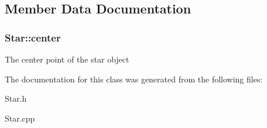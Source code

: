 \subsection{Member Data Documentation}
\hypertarget{classStar_a56595bbf2da9c7b2de04be76f61d2e93}{
\subsubsection[{center}]{ Star\-::center}}\label{classStar_a56595bbf2da9c7b2de04be76f61d2e93}
The center point of the star object 

The documentation for this class was generated from the following files\-:\begin{DoxyCompactItemize}
\item 
Star.\-h\item 
Star.\-cpp\end{DoxyCompactItemize}
